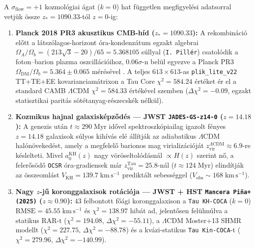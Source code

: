 \documentclass[11pt,a4paper]{article}
\theoremstyle{remark}
\begin{document}
A $\sigma_{\mathrm{flow}} = +1$ kozmol\'ogiai \'agat ($k = 0$) hat f\"uggetlen megfigyel\'esi adatsorral vetj\"uk \"ossze $z_* = 1090.33$-t\'ol $z = 0$-ig:

\begin{enumerate}
  \item \textbf{Planck 2018 PR3 akusztikus CMB-h\'id ($z_* = 1090.33$):} A rekombin\'aci\'o el\H{o}tt a l\'atsz\'olagos-horizont \'ora-kondenz\'atum egzakt algebrai $\Omega_A/\Omega_b = (213\sqrt{3}-20)/65 = 5.368105$ s\'ullyal (\texttt{I.\ Pill\'er}) csatol\'odik a foton--barion plazma oszcill\'aci\'oihoz, \textbf{$0.06\sigma$}-n bel\"ul egyezve a Planck PR3 $\Omega_{\mathrm{DM}}/\Omega_b = 5.364 \pm 0.065$ m\'er\'es\'evel \cite{Planck2018VI}. A teljes $613 \times 613$-as \texttt{plik\_lite\_v22} TT+TE+EE kovarianciam\'atrixon a Tau Core $\chi^2 = 584.24$ \'ert\'eket \'er el a standard CAMB $\Lambda\mathrm{CDM}$ $\chi^2 = 584.33$ \'ert\'ek\'evel szemben ($\Delta\chi^2 = -0.09$, egzakt statisztikai parit\'as s\"ot\'etanyag-r\'eszecsk\'ek n\'elk\"ul).
  \item \textbf{Kozmikus hajnal galaxisk\'epz\H{o}d\'es --- JWST \texttt{JADES-GS-z14-0} ($z = 14.18$):} A genezis ut\'an $t \approx 290\;\mathrm{Myr}$ id\H{o}vel spektroszk\'opiailag igazolt f\'enyes $z = 14.18$ galaxisok \cite{Carniani2024JADESz14} s\'ulyos kih\'iv\'as el\'e \'all\'itj\'ak az adiabatikus $\Lambda\mathrm{CDM}$ hal\'on\"oveked\'est, amely a megfelel\H{o} barionos mag virializ\'aci\'oj\'at $z_{\mathrm{vir}}^{\Lambda\mathrm{CDM}} \approx 6.9$-re k\'eslelteti. Mivel $a_0^{\mathrm{KH}}(z)$ nagy v\"or\"oseltol\'od\'asn\'al $\propto H(z)$ szerint n\H{o}, a feler\H{o}s\"od\H{o} \texttt{OCSR} \'ora-gradiensek m\'ar $z_{\mathrm{vir}}^{\mathrm{Tau}} = 25.8$-n\'al ($t \approx 124\;\mathrm{Myr}$) elind\'itj\'ak az \"osszeoml\'ast $V_{\mathrm{KH}} = 139.7\;\mathrm{km\,s^{-1}}$ predikt\'alt sebess\'eggel ($V_{\mathrm{obs}} \sim 168\;\mathrm{km\,s^{-1}}$).
  \item \textbf{Nagy $z$-j\H{u} koronggalaxisok rot\'aci\'oja --- JWST + HST \texttt{Mancera Pi\~na+ (2025)} ($z \approx 0.90$):} $43$ felbontott f\H{o}\'agi koronggalaxison \cite{ManceraPina2025} a \texttt{Tau KH-COCA} ($k = 0$) $\mathrm{RMSE} = 45.55\;\mathrm{km\,s^{-1}}$ \'es $\chi^2 = 138.97$ hib\'at ad, jelent\H{o}sen fel\"ulm\'ulva a statikus RAR-t ($\chi^2 = 194.08$, $\Delta\chi^2 = -55.11$), a $\Lambda\mathrm{CDM}$ Moster+13 SHMR modellt ($\chi^2 = 227.75$, $\Delta\chi^2 = -88.78$) \'es a kv\'azi-statikus \texttt{Tau Kin-COCA}-t ($\chi^2 = 279.96$, $\Delta\chi^2 = -140.99$).

\end{enumerate}
\end{document}
